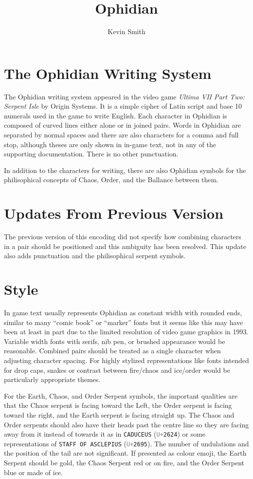 \documentclass[letterpaper]{article}
\author{Kevin Smith}
\newcommand{\codepoint}[1]{{\tt\textcolor{gray}{U+}#1}}
\newcommand{\glyphname}[1]{{\tt#1}}
\newcommand{\glyphref}[2]{\glyphname{#1} (\codepoint{#2})}
\begin{document}
\title{Ophidian}
\maketitle

\section{The Ophidian Writing System}

The Ophidian writing system appeared in the video game \textit{Ultima VII Part Two: Serpent Isle} by Origin Systems.  It is a simple cipher of Latin script and base 10 numerals used in the game to write English.  Each character in Ophidian is composed of curved lines either alone or in joined pairs.  Words in Ophidian are separated by normal spaces and there are also characters for a comma and full stop, although theses are only shown in in-game text, not in any of the supporting documentation.  There is no other punctuation.

In addition to the characters for writing, there are also Ophidian symbols for the philisophical concepts of Chaos, Order, and the Ballance between them.

\section{Updates From Previous Version}

The previous version of this encoding did not specify how combining characters in a pair should be positioned and this ambiguity has been resolved.  This update also adds punctuation and the philisophical serpent symbols.

\section{Style}

In game text usually represents Ophidian as constant width with rounded ends, similar to many ``comic book'' or ``marker'' fonts but it seems like this may have been at least in part due to the limited resolution of video game graphics in 1993.  Variable width fonts with serifs, nib pen, or brushed appearance would be reasonable.  Combined pairs should be treated as a single character when adjusting character spacing. For highly stylized representations like fonts intended for drop caps, snakes or contrast between fire/chaos and ice/order would be particularly appropriate themes.

For the Earth, Chaos, and Order Serpent symbols, the important qualities are that the Chaos serpent is facing toward the Left, the Order serpent is facing toward the right, and the Earth serpent is facing straight up.  The Chaos and Order serpents should also have their heads past the centre line so they are facing away from it instead of towards it as in \glyphref{CADUCEUS}{2624} or some representations of \glyphref{STAFF OF ASCLEPIUS}{2695}.  The number of undulations and the position of the tail are not significant.  If presented as colour emoji, the Earth Serpent should be gold, the Chaos Serpent red or on fire, and the Order Serpent blue or made of ice.
\end{document}
